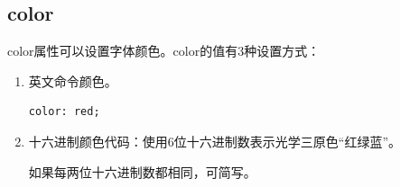 \subsection{color}

color属性可以设置字体颜色。color的值有3种设置方式：

\begin{enumerate}
    \item 英文命令颜色。 \\
          \begin{lstlisting}[style=htmlcssjs]
color: red;
    \end{lstlisting}

    \item 十六进制颜色代码：使用6位十六进制数表示光学三原色“红绿蓝”。
          \begin{table}[H]
              \centering
              \caption{颜色代码}
          \end{table}
          如果每两位十六进制数都相同，可简写。
          \begin{table}[H]
              \centering
              \caption{常见颜色代码}
          \end{table}


\end{enumerate}
